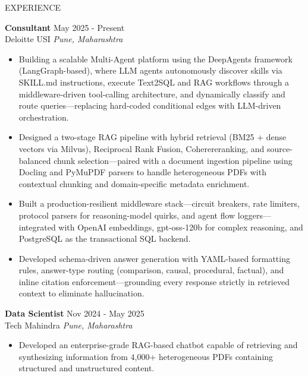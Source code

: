 \documentclass{resume}
\begin{document}
\begin{rSection}{EXPERIENCE}

\textbf{ Consultant } \hfill May 2025 - Present\\
Deloitte USI \hfill \textit{ Pune, Maharashtra }
 \begin{itemize}
    \itemsep -3pt {} 
    
    \item Building a scalable Multi-Agent platform using the DeepAgents framework (LangGraph-based), where LLM agents autonomously discover skills via SKILL.md instructions, execute Text2SQL and RAG workflows through a middleware-driven tool-calling architecture, and dynamically classify and route queries—replacing hard-coded conditional edges with LLM-driven orchestration.
    
    \item Designed a two-stage RAG pipeline with hybrid retrieval (BM25 + dense vectors via Milvus), Reciprocal Rank Fusion, Coherereranking, and source-balanced chunk selection—paired with a document ingestion pipeline using Docling and PyMuPDF parsers to handle heterogeneous PDFs with contextual chunking and domain-specific metadata enrichment.
    
    \item Built a production-resilient middleware stack—circuit breakers, rate limiters, protocol parsers for reasoning-model quirks, and agent flow loggers—integrated with OpenAI embeddings, gpt-oss-120b for complex reasoning, and PostgreSQL as the transactional SQL backend.
    
    \item Developed schema-driven answer generation with YAML-based formatting rules, answer-type routing (comparison, causal, procedural, factual), and inline citation enforcement—grounding every response strictly in retrieved context to eliminate hallucination.
    
 \end{itemize}

\textbf{ Data Scientist } \hfill Nov 2024 - May 2025\\
Tech Mahindra \hfill \textit{ Pune, Maharashtra }
 \begin{itemize}
    \itemsep -3pt {} 
    
    \item Developed an enterprise-grade RAG-based chatbot capable of retrieving and synthesizing information from 4,000+ heterogeneous PDFs containing structured and unstructured content.
    

\end{itemize}
\end{rSection}
\end{document}
